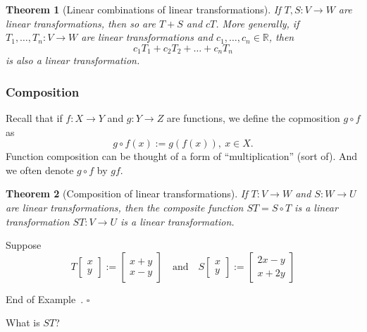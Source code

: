 \documentclass[10pt]{article}
\newtheorem{theorem}{Theorem}
\theoremstyle{definition}
\newtheorem{example}[theorem]{Example}
\renewenvironment{example}
{\begin{oldexample}}
  {\par\smallskip\hfill   End of Example~\theexample. $\square$    \par\end{oldexample}}
\newcommand{\R}{\mathbb{R}}           %
\begin{document}
\begin{theorem}[Linear combinations of linear transformations]
  \label{thm:linear-combinations-of-linear-transformations}
  If $T,S:V \to W$ are linear transformations, then so are $T+S$ and $cT$.
  More generally, if $T_{1},\ldots,T_{n}:V \to W$ are
  linear transformations and $c_{1},\ldots,c_{n}\in \R$, then
  \begin{equation*}
    c_{1}T_{1}+c_{2}T_{2}+\ldots+c_{n}T_{n}
  \end{equation*}
  is also a linear transformation.
\end{theorem}

\subsubsection{Composition}
Recall that if $f:X \to Y$ and $g:Y \to Z$ are functions, we define the
copmosition $g\circ f$ as
\begin{equation*}
  g\circ f(x) := g(f(x)), \ x\in X.
\end{equation*}
Function composition can be thought of a form of ``multiplication'' (sort of).
And we often denote $g\circ f$ by $gf$.

\begin{theorem}[Composition of linear transformations]
  \label{thm:composition-linear-transformations}
  If $T:V \to W$ and $S:W \to U$ are linear transformations, then the
  composite function $ST=S\circ T$ is a linear transformation $ST:V \to U$ is
  a linear transformation.
\end{theorem}

\begin{example}
  Suppose
  \begin{equation*}
    T
    \begin{bmatrix}
      x\\y
    \end{bmatrix}
    :=
    \begin{bmatrix}
      x+y\\x-y
    \end{bmatrix}
    \quad \text{and} \quad
    S
    \begin{bmatrix}
      x\\y
    \end{bmatrix}
    :=
    \begin{bmatrix}
      2x-y\\x+2y
    \end{bmatrix}
  \end{equation*}
\end{example}
What is $ST$?
\end{document}
